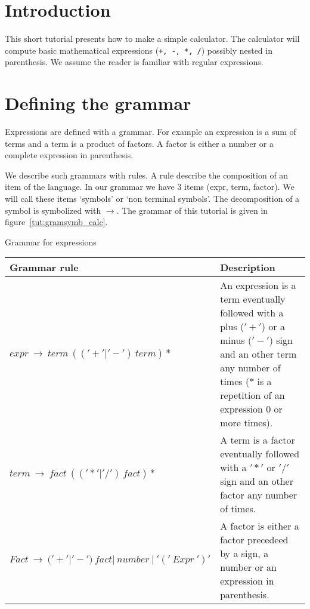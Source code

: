 %
%
%

\section{Introduction}

This short tutorial presents how to make a simple calculator.
The calculator will compute basic mathematical expressions (\verb|+, -, *, /|) possibly nested in parenthesis.
We assume the reader is familiar with regular expressions.

\section{Defining the grammar}

Expressions are defined with a grammar.
For example an expression is a sum of terms and a term is a product of factors. A factor is either a number or a complete expression in parenthesis.

We describe such grammars with rules. A rule describe the composition of an item of the language. In our grammar we have 3 items (expr, term, factor). We will call these items `symbols' or `non terminal symbols'. The decomposition of a symbol is symbolized with $\to$.
The grammar of this tutorial is given in figure~\ref{tut:gramsymb_calc}.

\begin{tableau}
\caption{Grammar for expressions}                           \label{tut:gramsymb_calc}
\begin{tabular}{| l | p{7cm} |}
\hline
    Grammar rule & Description \\
\hline
\hline
    $expr~\to~term~(('+'|'-')~term)*$
        & An expression is a term eventually followed with a plus ($'+'$) or a minus ($'-'$) sign and an other term any number of times ($*$ is a repetition of an expression 0 or more times). \\
\hline
    $term~\to~fact~(('*'|'/')~fact)*$
        & A term is a factor eventually followed with a $'*'$ or $'/'$ sign and an other factor any number of times. \\
\hline
    $Fact~\to~('+'|'-')~fact|~number~|~'('~Expr~')'$
        & A factor is either a factor precedeed by a sign, a number or an expression in parenthesis. \\
\hline
\end{tabular}
\end{tableau}

